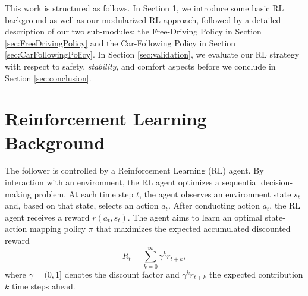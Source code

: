 \documentclass[review]{elsarticle}
\providecommand{\3}{{\ss}}
\begin{document}
	This work is structured as follows. In Section \ref{sec:RLBackground},
	we introduce some basic RL background as well as our modularized RL
	approach, followed by a detailed description of our two sub-modules:
	the Free-Driving Policy in Section \ref{sec:FreeDrivingPolicy} and the
	Car-Following Policy in Section
	\ref{sec:CarFollowingPolicy}. In Section \ref{sec:validation}, we evaluate our RL
	strategy with respect to safety, \emph{stability}, and comfort aspects
	before we conclude in Section \ref{sec:conclusion}.
	
	
	\section{Reinforcement Learning Background}
	\label{sec:RLBackground}
	
	The follower is controlled by a Reinforcement
	Learning (RL) agent. By interaction with an environment, the RL agent
	optimizes a sequential decision-making problem. At each time step
	$t$, the agent observes an environment state $s_t$ and, based on that state, selects
	an action $a_t$. After conducting action $a_t$, the RL agent receives
	a reward $r(a_t,s_t)$. The agent aims to learn an optimal state-action
	mapping policy $\pi$ that maximizes the expected accumulated
	discounted reward
	\begin{equation}
	\label{Rt}
	R_{t}=\sum_{k=0}^{\infty} \gamma^{k} r_{t+k},
	\end{equation}
	where $\gamma = (0,1]$ denotes the discount factor and 
	$\gamma^k r_{t+k}$ the expected contribution $k$ time steps ahead. 
\end{document}
